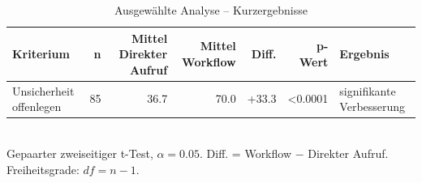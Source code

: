 \begin{table}[htbp]
\centering
\caption{Ausgewählte Analyse -- Kurzergebnisse}
\begin{tabular}{lrrrrrl}
\toprule
Kriterium & n & Mittel Direkter Aufruf & Mittel Workflow & Diff. & p-Wert & Ergebnis \\
\midrule
Unsicherheit offenlegen & 85 & 36.7 & 70.0 & +33.3 & <0.0001 & signifikante Verbesserung \\
\bottomrule
\end{tabular}
\\[2mm]
\footnotesize Gepaarter zweiseitiger t-Test, $\alpha=0.05$. Diff. = Workflow $-$ Direkter Aufruf. Freiheitsgrade: $df=n-1$.
\end{table}
